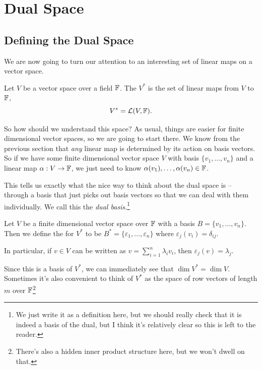 \documentclass[a4paper]{scrartcl}
\begin{document}
\section{Dual Space}

\subsection{Defining the Dual Space}

We are now going to turn our attention to an interesting set of linear maps on a vector space.

\begin{definition}
    Let $V$ be a vector space over a field $\mathbb{F}$. The  $V^*$ is the set of linear maps from $V$ to $\mathbb{F}$,
    $$
    V^* = \mathcal{L}(V, \mathbb{F}).
    $$
\end{definition}

So how should we understand this space?
As usual, things are easier for finite dimensional vector spaces, so we are going to start there. We know from the previous section that \emph{any} linear map is determined by its action on basis vectors. So if we have some finite dimensional vector space $V$ with basis $\{v_1, \dots, v_n\}$ and a linear map $\alpha: V \rightarrow \mathbb{F}$, we just need to know $\alpha(v_1), \dots, \alpha(v_n) \in \mathbb{F}$.

This tells us exactly what the nice way to think about the dual space is -- through a basis that just picks out basis vectors so that we can deal with them individually. We call this the \emph{dual basis}.\footnote{We just write it as a definition here, but we should really check that it is indeed a basis of the dual, but I think it's relatively clear so this is left to the reader.}

\begin{definition}
    Let $V$ be a finite dimensional vector space over $\mathbb{F}$ with a basis $B = \{v_1, \dots, v_n\}$. 
    Then we define the  for $V^*$ to be $B^* = \{\varepsilon_1, \dots, \varepsilon_n\}$ where $\varepsilon_j(v_i) = \delta_{ij}$.

    In particular, if $v \in V$ can be written as $v = \sum_{i = 1}^n \lambda_i v_i$, then $\varepsilon_j(v) = \lambda_j$.
\end{definition}

Since this is a basis of $V^*$, we can immediately see that $\dim V^* = \dim V$. Sometimes it's also convenient to think of $V^*$ as the space of row vectors of length $m$ over $\mathbb{F}$\footnote{There's also a hidden inner product structure here, but we won't dwell on that.}
\end{document}
